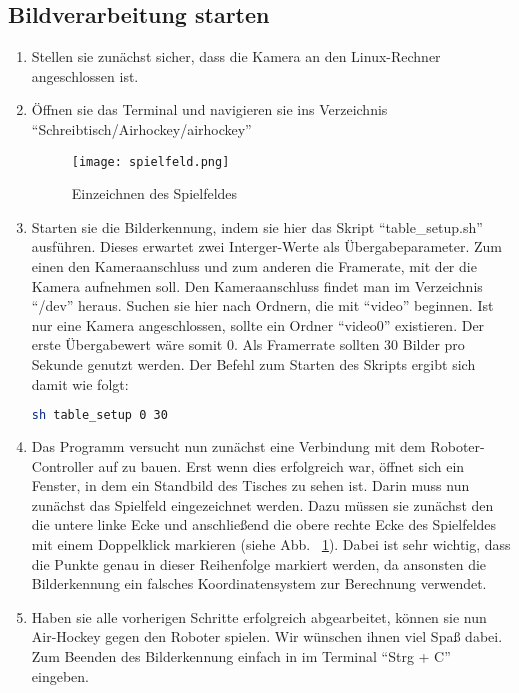 \subsection{Bildverarbeitung starten}
\begin{enumerate}
\item Stellen sie zunächst sicher, dass die Kamera an den Linux-Rechner angeschlossen ist.

\item Öffnen sie das Terminal und navigieren sie ins Verzeichnis \enquote{Schreibtisch/Airhockey/airhockey}


\begin{figure}[htbp]
\centering
\texttt{[image: spielfeld.png]}
\caption{Einzeichnen des Spielfeldes} 
\label{spielfeld}
\end{figure}

\item Starten sie die Bilderkennung, indem sie hier das Skript \enquote{table\_setup.sh} ausführen. Dieses erwartet zwei Interger-Werte als Übergabeparameter. Zum einen den Kameraanschluss und zum anderen die Framerate, mit der die Kamera aufnehmen soll. Den Kameraanschluss findet man im Verzeichnis \enquote{/dev} heraus. Suchen sie hier nach Ordnern, die mit \enquote{video} beginnen. Ist nur eine Kamera angeschlossen, sollte ein Ordner \enquote{video0} existieren. Der erste Übergabewert wäre somit 0. Als Framerrate sollten 30 Bilder pro Sekunde genutzt werden. Der Befehl zum Starten des Skripts ergibt sich damit wie folgt:

\begin{lstlisting}[caption=Terminal-Befahl zum starten der Bilderkennung, label=start, language=bash]
sh table_setup 0 30
\end{lstlisting} 

\item Das Programm versucht nun zunächst eine Verbindung mit dem Roboter-Controller auf zu bauen. Erst wenn dies erfolgreich war, öffnet sich ein Fenster, in dem ein Standbild des Tisches zu sehen ist. Darin muss nun zunächst das Spielfeld eingezeichnet werden. Dazu müssen sie zunächst den die untere linke Ecke und anschließend die obere rechte Ecke des Spielfeldes mit einem Doppelklick markieren (siehe Abb. ~\ref{spielfeld}). Dabei ist sehr wichtig, dass die Punkte genau in dieser Reihenfolge markiert werden, da ansonsten die Bilderkennung ein falsches Koordinatensystem zur Berechnung verwendet.   

\item Haben sie alle vorherigen Schritte erfolgreich abgearbeitet, können sie nun Air-Hockey gegen den Roboter spielen. Wir wünschen ihnen viel Spaß dabei. Zum Beenden des Bilderkennung einfach in im Terminal \enquote{Strg + C} eingeben.   

\end{enumerate} 

